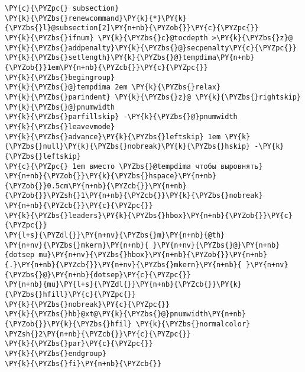 \begin{Verbatim}[commandchars=\\\{\}]
\PY{c}{\PYZpc{} subsection}
\PY{k}{\PYZbs{}renewcommand}\PY{k}{*}\PY{k}{\PYZbs{}l}@subsection[2]\PY{n+nb}{\PYZob{}}\PY{c}{\PYZpc{}}
\PY{k}{\PYZbs{}ifnum} \PY{k}{\PYZbs{}c}@tocdepth >\PY{k}{\PYZbs{}z}@
\PY{k}{\PYZbs{}addpenalty}\PY{k}{\PYZbs{}@}secpenalty\PY{c}{\PYZpc{}}
\PY{k}{\PYZbs{}setlength}\PY{k}{\PYZbs{}@}tempdima\PY{n+nb}{\PYZob{}}1em\PY{n+nb}{\PYZcb{}}\PY{c}{\PYZpc{}}
\PY{k}{\PYZbs{}begingroup}
\PY{k}{\PYZbs{}@}tempdima 2em \PY{k}{\PYZbs{}relax}
\PY{k}{\PYZbs{}parindent} \PY{k}{\PYZbs{}z}@ \PY{k}{\PYZbs{}rightskip} \PY{k}{\PYZbs{}@}pnumwidth
\PY{k}{\PYZbs{}parfillskip} -\PY{k}{\PYZbs{}@}pnumwidth
\PY{k}{\PYZbs{}leavevmode}
\PY{k}{\PYZbs{}advance}\PY{k}{\PYZbs{}leftskip} 1em \PY{k}{\PYZbs{}null}\PY{k}{\PYZbs{}nobreak}\PY{k}{\PYZbs{}hskip} -\PY{k}{\PYZbs{}leftskip} 
\PY{c}{\PYZpc{} 1em вместо \PYZbs{}@tempdima чтобы выровнять}
\PY{n+nb}{\PYZob{}}\PY{k}{\PYZbs{}hspace}\PY{n+nb}{\PYZob{}}0.5cm\PY{n+nb}{\PYZcb{}}\PY{n+nb}{\PYZob{}}\PYZsh{}1\PY{n+nb}{\PYZcb{}}\PY{k}{\PYZbs{}nobreak} \PY{n+nb}{\PYZcb{}}\PY{c}{\PYZpc{}}
\PY{k}{\PYZbs{}leaders}\PY{k}{\PYZbs{}hbox}\PY{n+nb}{\PYZob{}}\PY{c}{\PYZpc{}}
\PY{l+s}{\PYZdl{}}\PY{n+nv}{\PYZbs{}m}\PY{n+nb}{@th}
\PY{n+nv}{\PYZbs{}mkern}\PY{n+nb}{ }\PY{n+nv}{\PYZbs{}@}\PY{n+nb}{dotsep mu}\PY{n+nv}{\PYZbs{}hbox}\PY{n+nb}{\PYZob{}}\PY{n+nb}{.}\PY{n+nb}{\PYZcb{}}\PY{n+nv}{\PYZbs{}mkern}\PY{n+nb}{ }\PY{n+nv}{\PYZbs{}@}\PY{n+nb}{dotsep}\PY{c}{\PYZpc{}}
\PY{n+nb}{mu}\PY{l+s}{\PYZdl{}}\PY{n+nb}{\PYZcb{}}\PY{k}{\PYZbs{}hfill}\PY{c}{\PYZpc{}}
\PY{k}{\PYZbs{}nobreak}\PY{c}{\PYZpc{}}
\PY{k}{\PYZbs{}hb}@xt@\PY{k}{\PYZbs{}@}pnumwidth\PY{n+nb}{\PYZob{}}\PY{k}{\PYZbs{}hfil} \PY{k}{\PYZbs{}normalcolor} \PYZsh{}2\PY{n+nb}{\PYZcb{}}\PY{c}{\PYZpc{}}
\PY{k}{\PYZbs{}par}\PY{c}{\PYZpc{}}
\PY{k}{\PYZbs{}endgroup}
\PY{k}{\PYZbs{}fi}\PY{n+nb}{\PYZcb{}}


\end{Verbatim}
